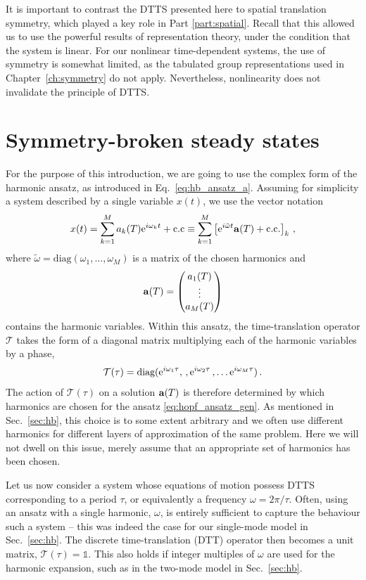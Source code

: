 It is important to contrast the DTTS presented here to spatial translation symmetry, which played a key role in Part \ref{part:spatial}. Recall that this allowed us to use the powerful results of representation theory, under the condition that the system is linear. For our nonlinear time-dependent systems, the use of symmetry is somewhat limited, as the tabulated group representations used in Chapter~\ref{ch:symmetry} do not apply. Nevertheless, nonlinearity does not invalidate the principle of DTTS. 

\section{Symmetry-broken steady states}

For the purpose of this introduction, we are going to use the complex form of the harmonic ansatz, as introduced in Eq.~\eqref{eq:hb_ansatz_a}. Assuming for simplicity a system described by a single variable $x(t)$, we use the vector notation
\begin{equation} \label{eq:hopf_ansatz_gen}
	x(t) = \sum_{k=1}^M a_{k}(T) {\rm e}^{i \omega_{k} t } + \text{c.c}  \equiv  \sum_{k=1}^M  \left[{\rm e}^{i \tilde{\omega} t} \vb{a}(T)  + \text{c.c.}\right]_k \,,
\end{equation}
where $\tilde{\omega} =  \text{diag}(\omega_1, \ldots, \omega_M)$ is a matrix of the chosen harmonics and
\begin{equation} \label{eq:hopf_a}
\vb{a}(T) = \mqty(a_1(T) \\ \vdots \\ a_M(T))
\end{equation}
contains the harmonic variables. Within this ansatz, the time-translation operator $\mathcal{T}$ takes the form of a diagonal matrix multiplying each of the harmonic variables by a phase,
\begin{equation}
\mathcal{T}(\tau) = \text{diag}({\rm e}^{i \omega_1 \tau} , \,, {\rm e}^{ i \omega_2 \tau} \,, \ldots {\rm e}^{i \omega_M \tau}) \,. 
\end{equation}
The action of $\mathcal{T}(\tau)$ on a solution $\vb{a}(T)$ is therefore determined by which harmonics are chosen for the ansatz \eqref{eq:hopf_ansatz_gen}. As mentioned in Sec.~\ref{sec:hb}, this choice is to some extent arbitrary and we often use different harmonics for different layers of approximation of the same problem. Here we will not dwell on this issue, merely assume that an appropriate set of harmonics has been chosen. 

Let us now consider a system whose equations of motion possess DTTS corresponding to a period $\tau$, or equivalently a frequency $\omega = 2\pi / \tau$. Often, using an ansatz with a single harmonic, $\omega$, is entirely sufficient to capture the behaviour such a system -- this was indeed the case for our single-mode model in Sec.~\ref{sec:hb}. The discrete time-translation (DTT) operator then becomes a unit matrix, $\mathcal{T}(\tau) = \mathbb{1}$. This also holds if integer multiples of $\omega$ are used for the harmonic expansion, such as in the two-mode model in Sec.~\ref{sec:hb}. 

